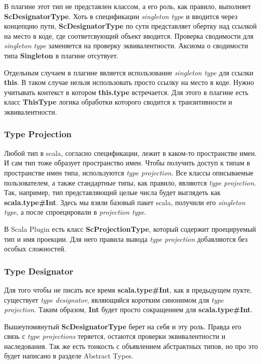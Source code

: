 В плагине этот тип не представлен классом, а его роль, как правило, выполняет
\textbf{ScDesignatorType}.
Хоть в спецификации \textit{singleton type} и вводится через концепцию пути,
\textbf{ScDesignatorType} по сути представляет обертку над ссылкой на место в коде,
где соответсвующий объект вводится.
Проверка сводимости для \textit{singleton type}  заменяется на проверку
эквивалентности.
Аксиома о сводимости типа \textbf{Singleton} в плагине отсутвует.

Отдельным случаем в плагине является использование \textit{singleton type} для
ссылки \textbf{this}.
В таком случае нельзя использовать просто ссылку на место в коде.
Нужно учитывать контекст в котором \textbf{this.type} встречается.
Для этого в плагине есть класс \textbf{ThisType} логика обработки которого
сводится к транзитивности и эквивалентности.


\subsubsection{Type Projection}

Любой тип в scala, согласно спецификации, лежит в каком-то пространстве имен.
И сам тип тоже образует пространство имен.
Чтобы получить доступ к типам в пространстве имен типа, используются
\textit{type projection}.
Все классы описываемые пользователем, а также стандартные типы,
как правило, являются \textit{type projection}.
Так, например, тип представляющий целые числа будет выглядеть как
\textbf{scala.type\#Int}.
Здесь мы взяли базовый пакет scala, получили его \textit{singleton type}, а после
спроецировали в \textit{projection type}.

В Scala Plugin есть класс \textbf{ScProjectionType}, который содержит
проецируемый тип и имя проекции.
Для него правила вывода \textit{type projection} добавляются без особых
сложностей.

\subsubsection{Type Designator}
Для того чтобы не писать все время \textbf{scala.type\#Int}, как в предыдущем пукте,
существует \textit{type designator}, являющийся коротким синонимом для
\textit{type projection}.
Таким образом, \textbf{Int} будет просто сокращением для \textbf{scala.type\#Int}.

Вышеупомянутый \textbf{ScDesignatorType} берет на себя и эту роль.
Правда его связь с \textit{type projections} теряется, остаются проверки
эквивалентности и наследования.
Так же есть тонкость с объявлением абстрактных типов, но про это будет написано
в разделе Abstract Types.

